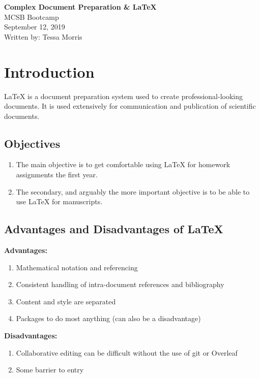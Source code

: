 \documentclass{article}
\begin{document}
\thispagestyle{empty} %
\begin{center}
    \Large
    \textbf{Complex Document Preparation \& LaTeX}\\
    \normalsize
    MCSB Bootcamp\\
    September 12, 2019\\
    Written by: Tessa Morris
\end{center}

\tableofcontents %
\newpage %

\section{Introduction}
LaTeX is a document preparation system used to create professional-looking documents. It is used extensively for communication and publication of scientific documents.

\subsection{Objectives}
\begin{enumerate}
    \item The main objective is to get comfortable using LaTeX for homework assignments the first year.
    \item The secondary, and arguably the more important objective is to be able to use LaTeX for manuscripts. 
\end{enumerate}

\subsection{Advantages and Disadvantages of LaTeX}
\textbf{Advantages:}
\begin{enumerate}
    \item Mathematical notation and referencing
    \item Consistent handling of intra-document references and bibliography
    \item Content and style are separated 
    \item Packages to do most anything (can also be a disadvantage)
\end{enumerate}
\textbf{Disadvantages:}
\begin{enumerate}
    \item Collaborative editing can be difficult without the use of git or Overleaf
    \item Some barrier to entry 
\end{enumerate}
\end{document}
